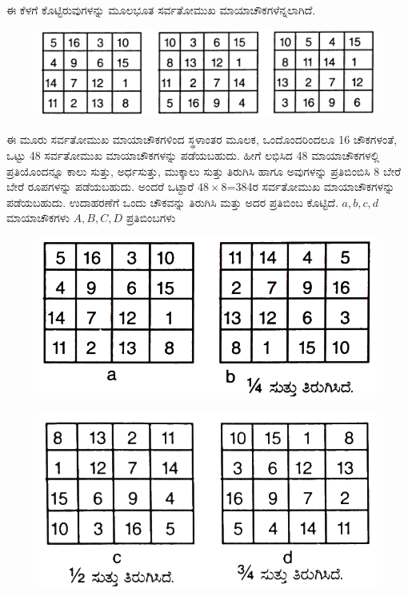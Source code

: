 ಈ ಕೆಳಗೆ ಕೊಟ್ಟಿರುವುಗಳನ್ನು ಮೂಲಭೂತ ಸರ್ವತೋಮುಖ ಮಾಯಾಚೌಕಗಳೆನ್ನಲಾಗಿದೆ.
\begin{figure}[H]
\includegraphics{src/figures/chap4/fig4-10.jpg}
\end{figure}

ಈ ಮೂರು ಸರ್ವತೋಮುಖ ಮಾಯಾಚೌಕಗಳಿಂದ ಸ್ಥಳಾಂತರ ಮೂಲಕ, ಒಂದೊಂದರಿಂದಲೂ 16 ಚೌಕಗಳಂತೆ, ಒಟ್ಟು 48 ಸರ್ವತೋಮುಖ ಮಾಯಾಚೌಕಗಳನ್ನು ಪಡೆಯಬಹುದು. ಹೀಗೆ ಲಭಿಸಿದ 48 ಮಾಯಾಚೌಕಗಳಲ್ಲಿ ಪ್ರತಿಯೊಂದನ್ನೂ ಕಾಲು ಸುತ್ತು, ಅರ್ಧಸುತ್ತು, ಮುಕ್ಕಾಲು ಸುತ್ತು ತಿರುಗಿಸಿ ಹಾಗೂ ಅವುಗಳನ್ನು ಪ್ರತಿಬಿಂಬಿಸಿ 8 ಬೇರೆ ಬೇರೆ ರೂಪಗಳನ್ನು ಪಡೆಯಬಹುದು. ಅಂದರೆ ಒಟ್ಟಾರೆ $48 \times 8$=384ರ ಸರ್ವತೋಮುಖ ಮಾಯಾಚೌಕಗಳನ್ನು ಪಡೆಯಬಹುದು. ಉದಾಹರಣೆಗೆ ಒಂದು ಚೌಕವನ್ನು ತಿರುಗಿಸಿ ಮತ್ತು ಅದರ ಪ್ರತಿಬಿಂಬ ಕೊಟ್ಟಿದೆ. $a, b, c, d$ ಮಾಯಾಚೌಕಗಳು $A, B, C, D$ ಪ್ರತಿಬಿಂಬಗಳು
\begin{figure}[H]
\includegraphics{src/figures/chap4/fig4-11.jpg}
\end{figure}
\begin{figure}[H]
\includegraphics{src/figures/chap4/fig4-12.jpg}
\end{figure}
